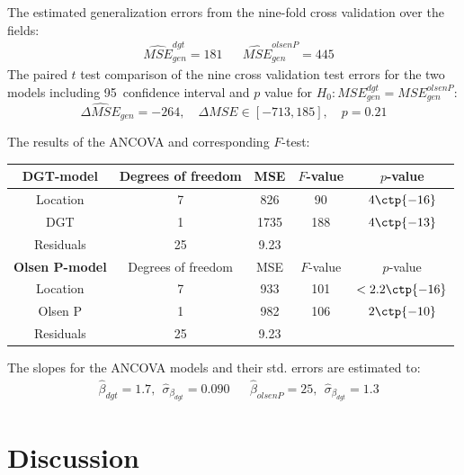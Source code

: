 \documentclass[11pt,fleqn]{article}
\begin{document}
The estimated generalization errors from the nine-fold cross validation over the fields:
\begin{align*}
	& \widehat {MSE}_{gen} ^{dgt} = 181
	&& \widehat {MSE}_{gen} ^{olsenP} = 445
\end{align*}
The paired \(t\) test comparison of the nine cross validation test errors for the two models including 95\pro\ confidence interval and \(p\) value for \(H_0: {MSE}_{gen} ^{dgt}={MSE}_{gen} ^{olsenP}\):
\[
\widehat{\Delta MSE}_{gen} = -264, \quad \Delta MSE\in [-713, 185],\quad  p=0.21
\]



\noindent
The results of the ANCOVA and corresponding \(F\)-test:  
\begin{table}[H]
	\centering
	\begin{tabular}{c | c c c c}
	\textbf{DGT-model}  &Degrees of freedom & MSE&\(F\)-value&\(p\)-value\\
	\hline 
	Location  & 7& 826 & 90 & \(4\ctp{-16}\)\\
	DGT  &1 &1735 &  188 & \(4\ctp{-13}\)\\
	Residuals &25 &9.23 &\\
	\hline 
	\textbf{Olsen P-model} &Degrees of freedom & MSE&\(F\)-value&\(p\)-value\\
	\hline 
	Location & 7&933 & 101 & \(<2.2\ctp{-16}\)\\
	Olsen P &1 &982 & 106 & \(2 \ctp{-10}\)\\
	Residuals &25  &9.23
	\end{tabular}
\end{table}\noindent 
The slopes for the ANCOVA models and their std. errors are estimated to:
\begin{align*}
	&\hat \beta_{dgt}= 1.7,\ \ \hat \sigma_{\beta_{dgt}}=0.090
	&&\hat \beta_{olsenP}= 25,\ \ \hat \sigma_{\beta_{dgt}}=1.3
\end{align*}
\section{Discussion}
\end{document}
